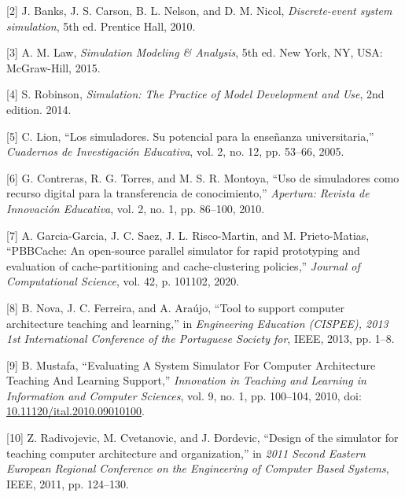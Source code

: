 \documentclass[12pt,twoside]{templates/unerthesis}
\begin{document}
\leavevmode\hypertarget{ref-banks_discrete-event_2010}{}%
{[}2{]} J. Banks, J. S. Carson, B. L. Nelson, and D. M. Nicol, \emph{Discrete-event system simulation}, 5th ed. Prentice Hall, 2010.

\leavevmode\hypertarget{ref-law_simulation_2015}{}%
{[}3{]} A. M. Law, \emph{Simulation Modeling \& Analysis}, 5th ed. New York, NY, USA: McGraw-Hill, 2015.

\leavevmode\hypertarget{ref-robinson_simulation_2014}{}%
{[}4{]} S. Robinson, \emph{Simulation: The Practice of Model Development and Use}, 2nd edition. 2014.

\leavevmode\hypertarget{ref-lion_simuladores_2005}{}%
{[}5{]} C. Lion, ``Los simuladores. Su potencial para la enseñanza universitaria,'' \emph{Cuadernos de Investigación Educativa}, vol. 2, no. 12, pp. 53--66, 2005.

\leavevmode\hypertarget{ref-contreras_uso_2010}{}%
{[}6{]} G. Contreras, R. G. Torres, and M. S. R. Montoya, ``Uso de simuladores como recurso digital para la transferencia de conocimiento,'' \emph{Apertura: Revista de Innovación Educativa}, vol. 2, no. 1, pp. 86--100, 2010.

\leavevmode\hypertarget{ref-garcia-garcia_pbbcache_2020}{}%
{[}7{]} A. Garcia-Garcia, J. C. Saez, J. L. Risco-Martin, and M. Prieto-Matias, ``PBBCache: An open-source parallel simulator for rapid prototyping and evaluation of cache-partitioning and cache-clustering policies,'' \emph{Journal of Computational Science}, vol. 42, p. 101102, 2020.

\leavevmode\hypertarget{ref-nova_tool_2013}{}%
{[}8{]} B. Nova, J. C. Ferreira, and A. Araújo, ``Tool to support computer architecture teaching and learning,'' in \emph{Engineering Education (CISPEE), 2013 1st International Conference of the Portuguese Society for}, IEEE, 2013, pp. 1--8.

\leavevmode\hypertarget{ref-mustafa_evaluating_2010}{}%
{[}9{]} B. Mustafa, ``Evaluating A System Simulator For Computer Architecture Teaching And Learning Support,'' \emph{Innovation in Teaching and Learning in Information and Computer Sciences}, vol. 9, no. 1, pp. 100--104, 2010, doi: \href{https://doi.org/10.11120/ital.2010.09010100}{10.11120/ital.2010.09010100}.

\leavevmode\hypertarget{ref-radivojevic_design_2011}{}%
{[}10{]} Z. Radivojevic, M. Cvetanovic, and J. Ðordevic, ``Design of the simulator for teaching computer architecture and organization,'' in \emph{2011 Second Eastern European Regional Conference on the Engineering of Computer Based Systems}, IEEE, 2011, pp. 124--130.
\end{document}
